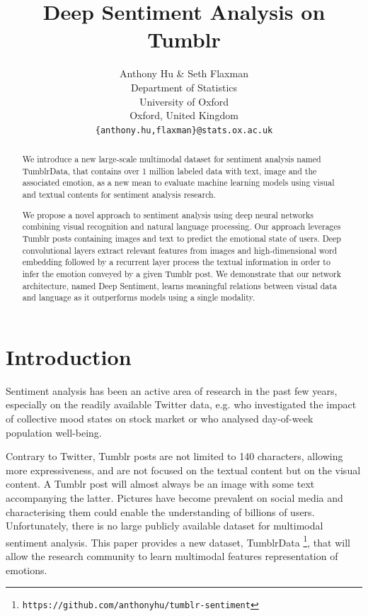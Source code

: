 \documentclass{article} %
\title{Deep Sentiment Analysis on Tumblr}
\author{Anthony Hu \& Seth Flaxman \\
Department of Statistics\\
University of Oxford\\
Oxford, United Kingdom \\
\texttt{\{anthony.hu,flaxman\}@stats.ox.ac.uk}
}
\begin{document}
\maketitle

\begin{abstract}
We introduce a new large-scale multimodal dataset for sentiment analysis named TumblrData, that contains over 1 million labeled data with text, image and the associated emotion, as a new mean to evaluate machine learning models using visual and textual contents for sentiment analysis research.

We propose a novel approach to sentiment analysis using deep neural networks combining visual recognition and natural language processing. Our approach leverages Tumblr posts containing images and text to predict the emotional state of users. Deep convolutional layers extract relevant features from images and high-dimensional word embedding followed by a recurrent layer process the textual information in order to infer the emotion conveyed by a given Tumblr post. We demonstrate that our network architecture, named Deep Sentiment, learns meaningful relations between visual data and language as it outperforms models using a single modality.%
\end{abstract}

\section{Introduction}
Sentiment analysis has been an active area of research in the past few years, especially on the readily available Twitter data, e.g. \citet{Bollen} who investigated the impact of collective mood states on stock market or \cite{Flaxman-16} who analysed day-of-week population well-being.

Contrary to Twitter, Tumblr posts are not limited to 140 characters, allowing more expressiveness, and are not focused on the textual content but on the visual content. A Tumblr post will almost always be an image with some text accompanying the latter. Pictures have become prevalent on social media and characterising them could enable the understanding of billions of users. Unfortunately, there is no large publicly available dataset for multimodal sentiment analysis. This paper provides a new dataset, TumblrData \footnote{\texttt{https://github.com/anthonyhu/tumblr-sentiment}}, that will allow the research community to learn multimodal features representation of emotions.
\end{document}
